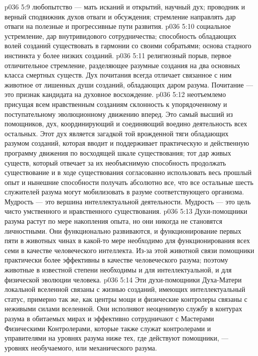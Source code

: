 \vs p036 5:9 \pc {}\bibnobreakspace {} любопытство --- мать исканий и открытий, научный дух; проводник и верный сподвижник духов отваги и обсуждения; стремление направлять дар отваги на полезные и прогрессивные пути развития.
\vs p036 5:10 \pc {}\bibnobreakspace {} социальное устремление, дар внутривидового сотрудничества; способность обладающих волей созданий существовать в гармонии со своими собратьями; основа стадного инстинкта у более низких созданий.
\vs p036 5:11 \pc {}\bibnobreakspace {} религиозный порыв, первое отличительное стремление, разделяющее разумные создания на два основных класса смертных существ. Дух почитания всегда отличает связанное с ним животное от лишенных души созданий, обладающих даром разума. Почитание --- это признак кандидата на духовное восхождение.
\vs p036 5:12 \pc {}\bibnobreakspace {} неотъемлемо присущая всем нравственным созданиям склонность к упорядоченному и поступательному эволюционному движению вперед. Это самый высший из помощников, дух, координирующий и соединяющий воедино деятельность всех остальных. Этот дух является загадкой той врожденной тяги обладающих разумом созданий, которая вводит и поддерживает практическую и действенную программу движения по восходящей шкале существования; тот дар живых существ, который отвечает за их необъяснимую способность продолжать существование и в ходе существования согласованно использовать весь прошлый опыт и нынешние способности получать абсолютно все, что все остальные шесть служителей разума могут мобилизовать в разуме соответствующего организма. Мудрость --- это вершина интеллектуальной деятельности. Мудрость --- это цель чисто умственного и нравственного существования.
\vs p036 5:13 \pc Духи\hyp{}помощники разума растут по мере накопления опыта, но они никогда не становятся личностными. Они функционально развиваются, и функционирование первых пяти в животных чинах в какой\hyp{}то мере необходимо для функционирования всех семи в качестве человеческого интеллекта. Из\hyp{}за этой животной связи помощники практически более эффективны в качестве человеческого разума; поэтому животные в известной степени необходимы и для интеллектуальной, и для физической эволюции человека.
\vs p036 5:14 Эти духи\hyp{}помощники Духа\hyp{}Матери локальной вселенной связаны с жизнью созданий, имеющих интеллектуальный статус, примерно так же, как центры мощи и физические контролеры связаны с неживыми силами вселенной. Они исполняют неоценимую службу в контурах разума в обитаемых мирах и эффективно сотрудничают с Мастерами Физическими Контролерами, которые также служат контролерами и управителями на уровнях разума ниже тех, где действуют помощники, --- уровнях необучаемого, или механического разума.
